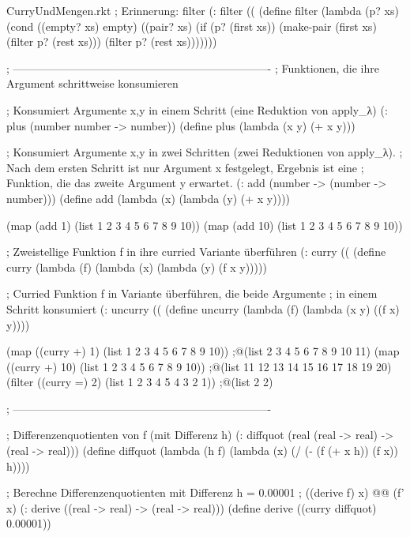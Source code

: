 \begin{filecontents*}{CurryUndMengen.rkt}
; Erinnerung: filter
(: filter ((%
(define filter
  (lambda (p? xs)
    (cond ((empty? xs) empty)
          ((pair? xs)  (if (p? (first xs))
                           (make-pair (first xs) (filter p? (rest xs)))
                           (filter p? (rest xs)))))))

; ----------------------------------------------------------------------
; Funktionen, die ihre Argument schrittweise konsumieren

; Konsumiert Argumente x,y in einem Schritt (eine Reduktion von apply_λ)
(: plus (number number -> number))
(define plus
  (lambda (x y)
    (+ x y)))

; Konsumiert Argumente x,y in zwei Schritten (zwei Reduktionen von apply_λ).
; Nach dem ersten Schritt ist nur Argument x festgelegt, Ergebnis ist eine
; Funktion, die das zweite Argument y erwartet.
(: add (number -> (number -> number)))
(define add
  (lambda (x)
    (lambda (y)
      (+ x y))))

(map (add 1)  (list 1 2 3 4 5 6 7 8 9 10))
(map (add 10) (list 1 2 3 4 5 6 7 8 9 10))


; Zweistellige Funktion f in ihre curried Variante überführen
(: curry ((%
(define curry
  (lambda (f)
    (lambda (x)
      (lambda (y)
        (f x y)))))

; Curried Funktion f in Variante überführen, die beide Argumente
; in einem Schritt konsumiert
(: uncurry ((%
(define uncurry
  (lambda (f)
    (lambda (x y)  
      ((f x) y))))

(map ((curry +) 1)  (list 1 2 3 4 5 6 7 8 9 10))
;@\eval@ (list 2 3 4 5 6 7 8 9 10 11)
(map ((curry +) 10) (list 1 2 3 4 5 6 7 8 9 10))
;@\eval@ (list 11 12 13 14 15 16 17 18 19 20)
(filter ((curry =) 2) (list 1 2 3 4 5 4 3 2 1))
;@\eval@ (list 2 2)


; ----------------------------------------------------------------------

; Differenzenquotienten von f (mit Differenz h)
(: diffquot (real (real -> real) -> (real -> real)))
(define diffquot
  (lambda (h f)
    (lambda (x)
      (/ (- (f (+ x h)) (f x))
         h))))

; Berechne Differenzenquotienten mit Differenz h = 0.00001
; ((derive f) x) @\latexcode{$\equiv$}@ (f' x)
(: derive ((real -> real) -> (real -> real)))
(define derive
  ((curry diffquot) 0.00001))



\end{filecontents*}

